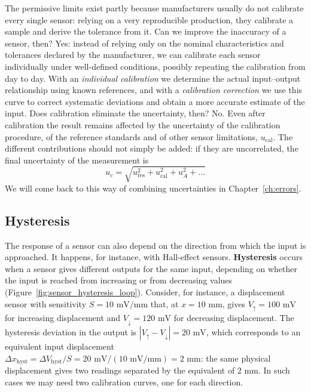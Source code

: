 \documentclass[letterpaper,11pt,leqno]{book}
\begin{document}
The permissive limits exist partly because manufacturers usually do not calibrate every single sensor: relying on a very reproducible production, they calibrate a sample and derive the tolerance from it. Can we improve the inaccuracy of a sensor, then? Yes: instead of relying only on the nominal characteristics and tolerances declared by the manufacturer, we can calibrate each sensor individually under well-defined conditions, possibly repeating the calibration from day to day. With an \emph{individual calibration} we determine the actual input--output relationship using known references, and with a \emph{calibration correction} we use this curve to correct systematic deviations and obtain a more accurate estimate of the input. Does calibration eliminate the uncertainty, then? No. Even after calibration the result remains affected by the uncertainty of the calibration procedure, of the reference standards and of other sensor limitations, $u_{\text{cal}}$. The different contributions should not simply be added: if they are uncorrelated, the final uncertainty of the measurement is
\begin{equation}
\boxed{u_c = \sqrt{u_{\text{res}}^2 + u_{\text{cal}}^2 + u_A^2 + \dots}}
\label{eq:combined_uncertainty_quadrature}
\end{equation}
We will come back to this way of combining uncertainties in Chapter~\ref{ch:errors}.

\subsection{Hysteresis}

The response of a sensor can also depend on the direction from which the input is approached. It happens, for instance, with Hall-effect sensors. \textbf{Hysteresis} occurs when a sensor gives different outputs for the same input, depending on whether the input is reached from increasing or from decreasing values (Figure~\ref{fig:sensor_hysteresis_loop}). Consider, for instance, a displacement sensor with sensitivity $S = 10\text{ mV/mm}$ that, at $x = 10\text{ mm}$, gives $V_\uparrow = 100\text{ mV}$ for increasing displacement and $V_\downarrow = 120\text{ mV}$ for decreasing displacement. The hysteresis deviation in the output is $|V_\uparrow - V_\downarrow| = 20\text{ mV}$, which corresponds to an equivalent input displacement $\Delta x_{\text{hyst}} = \Delta V_{\text{hyst}}/S = 20\text{ mV}/(10\text{ mV/mm}) = 2\text{ mm}$: the same physical displacement gives two readings separated by the equivalent of $2\text{ mm}$. In such cases we may need two calibration curves, one for each direction.
\end{document}
